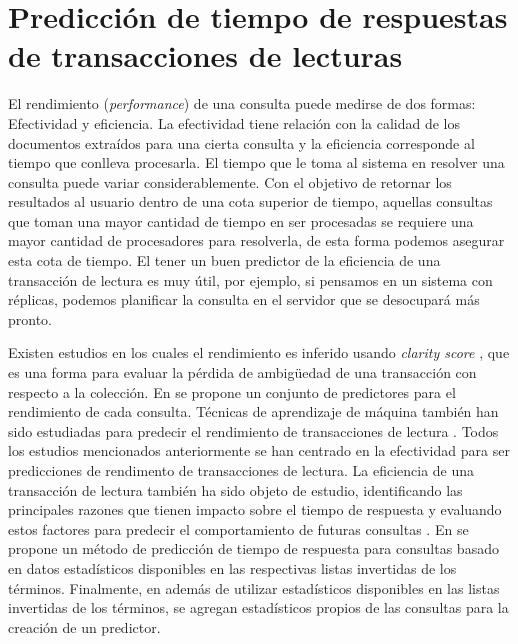 \section{Predicción de tiempo de respuestas de transacciones de lecturas}
\label{marco:prediccion}
El rendimiento (\textit{performance}) de una consulta puede medirse de dos formas: Efectividad y eficiencia. La efectividad tiene relación con la calidad de los documentos extraídos para una cierta consulta y la eficiencia corresponde al tiempo que conlleva procesarla. El tiempo que le toma al sistema en resolver una consulta puede variar considerablemente. Con el objetivo de retornar los resultados al usuario dentro de una cota superior de tiempo, aquellas consultas que toman una mayor cantidad de tiempo en ser procesadas se requiere una mayor cantidad de procesadores para resolverla, de esta forma podemos asegurar esta cota de tiempo. El tener un buen predictor de la eficiencia de una transacción de lectura es muy útil, por ejemplo, si pensamos en un sistema con réplicas, podemos planificar la consulta en el servidor que se desocupará más pronto. 

Existen estudios en los cuales el rendimiento es inferido usando \textit{clarity score} \citep{Cronen-Townsend:2002}, que es una forma para evaluar la pérdida de ambigüedad de una transacción con respecto a la colección. En \citep{He:2004} se propone un conjunto de predictores para el rendimiento de cada consulta. Técnicas de aprendizaje de máquina también han sido estudiadas para predecir el rendimiento de transacciones de lectura \citep{Si:2002}. Todos los estudios mencionados anteriormente se han centrado en la efectividad para ser predicciones de rendimento de transacciones de lectura. La eficiencia de una transacción de lectura también ha sido objeto de estudio, identificando las principales razones que tienen impacto sobre el tiempo de respuesta y evaluando estos factores para predecir el comportamiento de futuras consultas \citep{Tonellotto:2011}. En \citep{Macdonald:2012} se propone un método de predicción de tiempo de respuesta para consultas basado en datos estadísticos disponibles en las respectivas listas invertidas de los términos. Finalmente, en \citep{Jeon:2014} además de utilizar estadísticos disponibles en las listas invertidas de los términos, se agregan estadísticos propios de las consultas para la creación de un predictor. 

